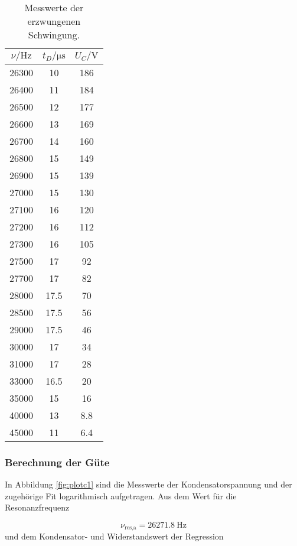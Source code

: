 \begin{table}[h]
  \centering
  \begin{tabular}{c c c}
    \toprule
    $\nu/\si{\hertz}$ & $t_D/\si{\micro\second}$ & $U_C/\si{\volt}$ \\
    \midrule
    26300 & 10 & 186 \\
    26400 & 11 & 184 \\
    26500 & 12 & 177 \\
    26600 & 13 & 169 \\
    26700 & 14 & 160 \\
    26800 & 15 & 149 \\
    26900 & 15 & 139 \\
    27000 & 15 & 130 \\
    27100 & 16 & 120 \\
    27200 & 16 & 112 \\
    27300 & 16 & 105 \\
    27500 & 17 & 92 \\
    27700 & 17 & 82 \\
    28000 & 17.5 & 70 \\
    28500 & 17.5 & 56 \\
    29000 & 17.5 & 46 \\
    30000 & 17 & 34 \\
    31000 & 17 & 28 \\
    33000 & 16.5 & 20 \\
    35000 & 15 & 16 \\
    40000 & 13 & 8.8 \\
    45000 & 11 & 6.4 \\
    \bottomrule
  \end{tabular}
  \caption{Messwerte der erzwungenen Schwingung.}
  \label{tab:Messung3b}
\end{table}


\subsubsection{Berechnung der Güte}

In Abbildung \ref{fig:plotc1} sind
die Messwerte der Kondensatorspannung und der zugehörige Fit logarithmisch
aufgetragen. Aus dem Wert für die Resonanzfrequenz

\begin{equation}
  \nu_\text{res,a} = \SI{26271.8}{\hertz}
\end{equation}
und dem Kondensator- und Widerstandswert der Regression

